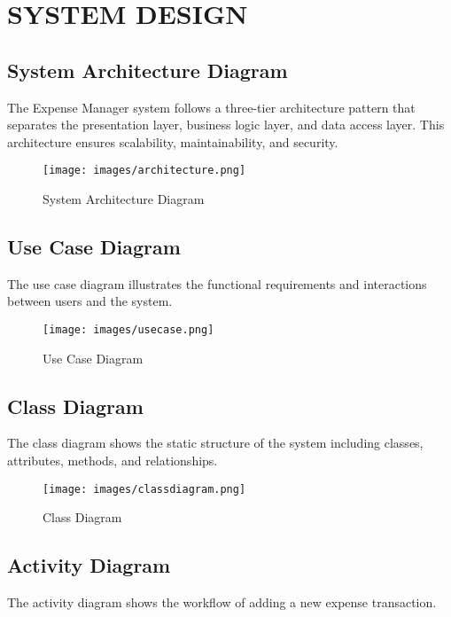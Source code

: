 \chapter{SYSTEM DESIGN}

\section{System Architecture Diagram}

The Expense Manager system follows a three-tier architecture pattern that separates the presentation layer, business logic layer, and data access layer. This architecture ensures scalability, maintainability, and security.

\begin{figure}[H]
\centering
\texttt{[image: images/architecture.png]}
\caption{System Architecture Diagram}
\label{fig:architecture}
\end{figure}

\section{Use Case Diagram}

The use case diagram illustrates the functional requirements and interactions between users and the system.

\begin{figure}[H]
\centering
\texttt{[image: images/usecase.png]}
\caption{Use Case Diagram}
\label{fig:usecase}
\end{figure}

\section{Class Diagram}

The class diagram shows the static structure of the system including classes, attributes, methods, and relationships.

\begin{figure}[H]
\centering
\texttt{[image: images/classdiagram.png]}
\caption{Class Diagram}
\label{fig:class}
\end{figure}

\section{Activity Diagram}

The activity diagram shows the workflow of adding a new expense transaction.

